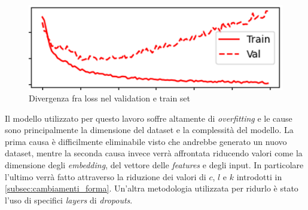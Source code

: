     \begin{figure}[h]
        \centering
        \includegraphics[scale=0.55]{images/LossOverfitting.png}
        \caption{Divergenza fra loss nel validation e train set}
        \label{fig:overfitting_grafo_divergenza}
    \end{figure}
Il modello utilizzato per questo lavoro soffre altamente di \textit{overfitting} e le cause sono principalmente la dimensione del dataset e la complessità del modello.
La prima causa è difficilmente eliminabile visto che andrebbe generato un nuovo dataset, mentre la seconda causa invece verrà affrontata riducendo valori come la dimensione degli \textit{embedding}, del vettore delle \textit{features} e degli input.
In particolare l'ultimo verrà fatto attraverso la riduzione dei valori di $c$, $l$ e $k$ introdotti in \autoref{subsec:cambiamenti_forma}.
Un'altra metodologia utilizzata per ridurlo è stato l'uso di specifici \textit{layers} di \textit{dropouts}.


